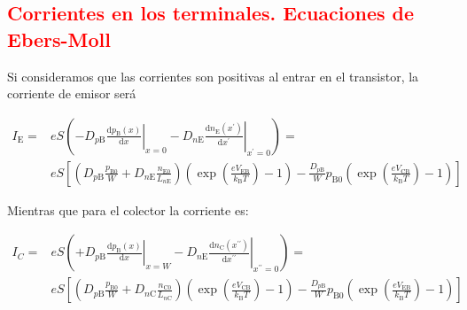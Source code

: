 \subsection{\textcolor{red}{Corrientes en los terminales. Ecuaciones de Ebers-Moll}}
Si consideramos que las corrientes son positivas al entrar en el transistor, la corriente de emisor será

\begin{equation}
\begin{aligned}
    I_\mathrm{E}=&e S\left(-\left.D_{p \mathrm{B}} \frac{\mathrm{d} p_\mathrm{B}(x)}{\mathrm{d} x}\right|_{x=0}-\left.D_{n \mathrm{E}} \frac{\mathrm{d} n_\mathrm{E}\left(x^{\prime}\right)}{\mathrm{d} x^{\prime}}\right|_{x^{\prime}=0}\right)=\\&e S\left[\left(D_{p \mathrm{B}} \frac{p_{\mathrm{B} 0}}{W}+D_{n \mathrm{E}} \frac{n_{\mathrm{E} 0}}{L_{n \mathrm{E}}}\right)\left(\exp{\left(\frac{e V_\mathrm{EB}}{k_\mathrm{B}T}\right)}-1\right)-\frac{D_{p \mathrm{B}}}{W} p_{\mathrm{B} 0}\left(\exp{\left(\frac{e V_\mathrm{CB}}{k_\mathrm{B}T}\right)}-1\right)\right] 
    \end{aligned}
\end{equation}

Mientras que para el colector la corriente es:

\begin{equation}
\begin{aligned}
 I_C=&e S\left(+\left.D_{p \mathrm{B}} \frac{\mathrm{d} p_\mathrm{B}(x)}{\mathrm{d} x}\right|_{x=W}-\left.D_{n \mathrm{E}} \frac{\mathrm{d} n_\mathrm{C}\left(x^{\prime \prime}\right)}{\mathrm{d} x^{\prime \prime }} \right|_{x^{\prime \prime}=0}\right)=\\&e S\left[\left(D_{p \mathrm{B}} \frac{p_{\mathrm{B} 0}}{W}+D_{n \mathrm{C}} \frac{n_{\mathrm{C} 0}}{L_{n \mathrm{C}}}\right)\left(\exp{\left(\frac{e V_\mathrm{CB}}{k_\mathrm{B}T}\right)}-1\right)-\frac{D_{p \mathrm{B}}}{W} p_{\mathrm{B} 0}\left(\exp{\left(\frac{e V_\mathrm{EB}}{k_\mathrm{B}T}\right)}-1\right)\right] 
 \end{aligned}
\end{equation}


